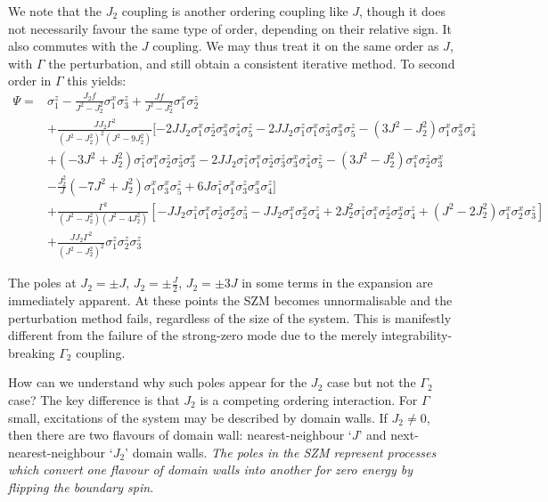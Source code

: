 \documentclass [a4paper, 11pt]{article}
\begin{document}
We note that the $J_2$ coupling is another ordering coupling like $J$, though it does not necessarily favour the same type of order, depending on their relative sign. It also commutes with the $J$ coupling. We may thus treat it on the same order as $J$, with $\Gamma$ the perturbation, and still obtain a consistent iterative method. To second order in $\Gamma$ this yields:
\begin{align*}
  \label{eq:2ndorderJ2}
  \Psi =& \sigma^z_{1} - \frac{J_{2} f}{J^{2} - J_{2}^{2}} \sigma^x_{1} \sigma^z_{3} + \frac{J f}{J^{2} - J_{2}^{2}} \sigma^x_{1} \sigma^z_{2}\\
&+ \frac{J J_2 \Gamma^2}{(J^2-J_2^2)^2(J^2-9 J_2^2)}[ - 2 J J_{2} \sigma^x_{1} \sigma^z_{2} \sigma^x_{3} \sigma^z_{4} \sigma^z_{5} - 2 J J_{2} \sigma^z_{1} \sigma^x_{1} \sigma^z_{3} \sigma^x_{3} \sigma^z_{5} -\left(3 J^{2} - J_{2}^{2}\right) \sigma^x_{1} \sigma^x_{3} \sigma^z_{4}\\ 
& + \left(- 3 J^{2} + J_{2}^{2}\right) \sigma^z_{1} \sigma^x_{1} \sigma^z_{2} \sigma^z_{3} \sigma^x_{3} - 2 J J_{2} \sigma^z_{1} \sigma^x_{1} \sigma^z_{2} \sigma^z_{3} \sigma^x_{3} \sigma^z_{4} \sigma^z_{5} - \left(3 J^{2} - J_{2}^{2}\right) \sigma^x_{1} \sigma^z_{2} \sigma^x_{3}\\ 
& - \frac{J_{2}^{2}}{J} \left(- 7 J^{2} + J_{2}^{2}\right) \sigma^x_{1} \sigma^x_{3} \sigma^z_{5} + 6 J \sigma^z_{1} \sigma^x_{1} \sigma^z_{3} \sigma^x_{3} \sigma^z_{4}]\\
&+\frac{\Gamma^2}{(J^2-J_2^2)(J^2-4 J_2^2)}\left[-J J_{2} \sigma^z_{1} \sigma^x_{1} \sigma^z_{2} \sigma^x_{2} \sigma^z_{3} - J J_{2} \sigma^x_{1} \sigma^x_{2} \sigma^z_{4}  + 2 J_{2}^{2} \sigma^z_{1} \sigma^x_{1} \sigma^z_{2} \sigma^x_{2} \sigma^z_{4} + \left(J^{2} - 2 J_{2}^{2}\right) \sigma^x_{1} \sigma^x_{2} \sigma^z_{3} \right] \\
&+ \frac{J J_{2} \Gamma^{2}}{(J^2-J_2^2)^2} \sigma^z_{1} \sigma^z_{2} \sigma^z_{3}
\end{align*}

The poles at $J_2 = \pm J$, $J_2 = \pm \frac{J}{2}$, $J_2 = \pm 3J$ in some terms in the expansion are immediately apparent.  At these points the SZM becomes unnormalisable and the perturbation method fails, regardless of the size of the system. This is manifestly different from the failure of the strong-zero mode due to the merely integrability-breaking $\Gamma_2$ coupling. 

How can we understand why such poles appear for the $J_2$ case but not the $\Gamma_2$ case? The key difference is that $J_2$ is a competing ordering interaction. For $\Gamma$ small, excitations of the system may be described by domain walls. If $J_2 \neq 0$, then there are two flavours of domain wall: nearest-neighbour `$J$' and next-nearest-neighbour `$J_2$' domain walls. \textit{The poles in the SZM represent processes which convert one flavour of domain walls into another for zero energy by flipping the boundary spin.}
\end{document}
